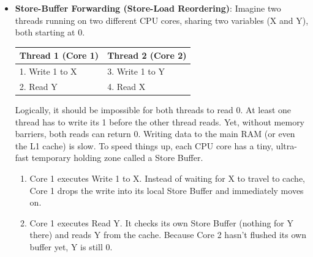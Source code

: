 \documentclass{report}
\begin{document}
\begin{itemize}
\begin{enumerate}
            \end{enumerate}
            Memory ordering defines how compilers and CPU hardware are allowed to reorder read and write operations across multiple threads
            \begin{itemize}
                \item \textbf{Single-threaded code:} Compilers and CPUs change instruction order to make code run faster. This reordering is invisible because the final result stays the same. 
                \item \textbf{Multi-threaded code:} Other threads can spot these reordered operations. Without rules, one thread might see updates in a completely different order than another thread wrote them, breaking synchronization
            \end{itemize}
        \item \textbf{Store-Buffer Forwarding (Store-Load Reordering)}: Imagine two threads running on two different CPU cores, sharing two variables (X and Y), both starting at 0.
            \begin{center}
                \begin{tabularx}{\textwidth}{@{}XX@{}}
                    \toprule
                    \textbf{Thread 1 (Core 1)}& \textbf{Thread 2 (Core 2)} \\
                    \midrule
                    1. Write 1 to X &3. Write 1 to Y  \\[2ex]
                    2. Read Y &4. Read X \\
                    \bottomrule
                \end{tabularx}
            \end{center}
            Logically, it should be impossible for both threads to read 0. At least one thread has to write its 1 before the other thread reads.
            \bigbreak \noindent 
            Yet, without memory barriers, both reads can return 0.
            \bigbreak \noindent 
            Writing data to the main RAM (or even the L1 cache) is slow. To speed things up, each CPU core has a tiny, ultra-fast temporary holding zone called a Store Buffer.
            \begin{enumerate}
                \item Core 1 executes Write 1 to X. Instead of waiting for X to travel to cache, Core 1 drops the write into its local Store Buffer and immediately moves on.
                \item Core 1 executes Read Y. It checks its own Store Buffer (nothing for Y there) and reads Y from the cache. Because Core 2 hasn't flushed its own buffer yet, Y is still 0.

\end{enumerate}
\end{itemize}
\end{document}
